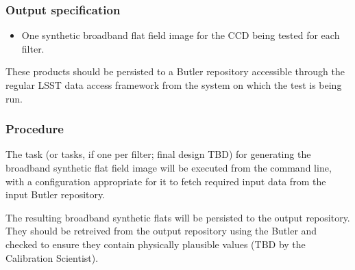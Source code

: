 \subsubsection{Output specification}

\begin{itemize}

  \item{One synthetic broadband flat field image for the CCD being tested for
  each filter.}

\end{itemize}

These products should be persisted to a Butler repository accessible through
the regular LSST data access framework from the system on which the test is
being run.

\subsubsection{Procedure}

The task (or tasks, if one per filter; final design TBD) for generating the
broadband synthetic flat field image will be executed from the command
line, with a configuration appropriate for it to fetch required input data
from the input Butler repository.

The resulting broadband synthetic flats will be persisted to the output
repository. They should be retreived from the output repository using the
Butler and checked to ensure they contain physically plausible values (TBD by
the Calibration Scientist).
